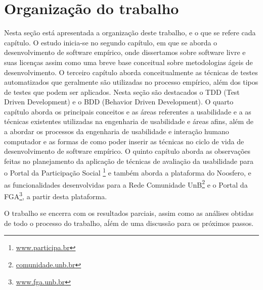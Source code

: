 \section{Organização do trabalho}

Nesta seção está apresentada a organização deste trabalho, e o que se refere cada capítulo.
%
O estudo inicia-se no segundo capítulo, em que se aborda o desenvolvimento de software empírico, onde dissertamos sobre software livre e suas licenças assim como uma breve base conceitual sobre metodologias ágeis de desenvolvimento.
%
O terceiro capítulo aborda conceitualmente as técnicas de testes automatizados que geralmente são utilizadas no processo empírico, além dos tipos de testes que podem ser aplicados. Nesta seção são destacados o TDD (Test Driven Development) e o BDD (Behavior Driven Development).
%
O quarto capítulo aborda os principais conceitos e as áreas referentes a usabilidade e a as técnicas existentes utilizadas na engenharia de usabilidade e áreas afins, além de a abordar os processos da engenharia de usabilidade e interação humano computador e as formas de como poder inserir as técnicas no ciclo de vida de desenvolvimento de software empírico.
%
O quinto capítulo aborda as observações feitas no planejamento da aplicação de técnicas de avaliação da usabilidade para o Portal da Participação Social \footnote{\url{www.participa.br}} e também aborda a plataforma do Noosfero, e as funcionalidades desenvolvidas para a Rede Comunidade UnB\footnote{\url{comunidade.unb.br}} e o Portal da FGA\footnote{\url{www.fga.unb.br}}, a partir desta plataforma.

O trabalho se encerra com os resultados parciais, assim como as análises obtidas de todo o processo do trabalho, aĺém de uma discussão para os próximos passos.

